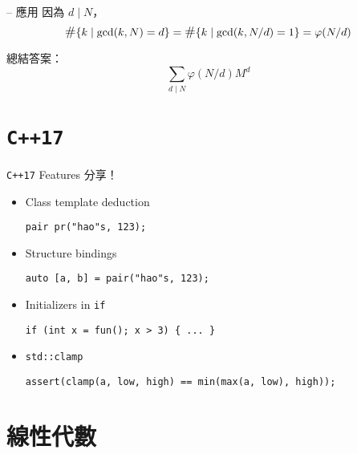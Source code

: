 \documentclass[notheorems,xcolor=dvipsnames]{beamer}
\renewcommand*{\sharp}{\mathlarger{\#}}
\theoremstyle{definition}
\begin{document}
\begin{frame}{{\secname} -- 應用}
  因為 $d \mid N$，
  \[ \sharp \{ k \mid \gcd(k, N) = d \} = \sharp \{ k \mid \gcd(k, N/d) = 1 \} = \varphi(N/d) \]
  \pause

  \bigskip
  總結答案：
  \[\sum_{d \mid N} \varphi(N/d) M^{d} \]

\end{frame}

\section{\texttt{C++17}}

\begin{frame}{{\secname}}
  \centering
  \Large
  \texttt{C++17} Features 分享！
\end{frame}

\begin{frame}[fragile]{{\secname}}
  \begin{itemize}[<+->]
    \setlength{\itemsep}{3mm}
    \item Class template deduction
      \begin{verbatim}
pair pr("hao"s, 123);
      \end{verbatim}
    \item Structure bindings
      \begin{verbatim}
auto [a, b] = pair("hao"s, 123);
      \end{verbatim}
    \item Initializers in \texttt{if}
      \begin{verbatim}
if (int x = fun(); x > 3) { ... }
      \end{verbatim}
    \item \texttt{std::clamp}
      \begin{verbatim}
assert(clamp(a, low, high) == min(max(a, low), high));
      \end{verbatim}
  \end{itemize}
\end{frame}

\section{線性代數}
\end{document}
